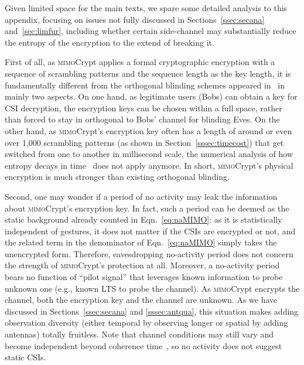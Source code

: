 \documentclass[conference,compsoc]{IEEEtran}
\newcommand{\name}{\textsc{mimo}Crypt\xspace}
\newcommand{\newrev}[1]{{\color{blue}#1}}    %
\newcommand{\newrev}[1]{#1}
\begin{document}
\newrev{
Given limited space for the main texts, we spare some detailed analysis to this appendix, focusing on issues not fully discussed in Sections~\ref{ssec:secana} and~\ref{sec:limfur}, including whether certain side-channel may substantially reduce the entropy of the encryption to the extend of breaking it. 

First of all, as \name applies a formal cryptographic encryption with a sequence of scrambling patterns and the sequence length as the key length, it is fundamentally different from the orthogonal blinding schemes appeared in~\cite{Strobe, Robin} in mainly two aspects. On one hand, as legitimate users (Bobs) can obtain a key for CSI decryption, the encryption keys can be chosen within a full space, rather than forced to stay in orthogonal to Bobs' channel for blinding Eves. On the other hand, as \name's encryption key often has a length of around or even over 1,000 scrambling patterns (as shown in Section~\ref{sssec:timecost}) that get switched from one to another in millisecond scale, the numerical analysis of how entropy decays in time~\cite{Robin} does not apply anymore. In short, \name's physical encryption is much stronger than existing orthogonal blinding.

Second, one may wonder if a period of no activity may leak the information about \name's encryption key. In fact, such a period can be deemed as the static background already counted in Eqn.~\eqref{eq:naMIMO}: as it is statistically independent of gestures, it does not matter if the CSIs are encrypted or not, and the related term in the denominator of Eqn.~\eqref{eq:naMIMO} simply takes the unencrypted form. Therefore, eavesdropping no-activity period does not concern the strength of \name's protection at all.
Moreover, a no-activity period bears no function of ``pilot signal'' that leverages known
information to probe unknown one (e.g., known LTS to probe the channel). As \name encrypts the
channel, both the encryption key and the channel are unknown. As we have discussed in Sections~\ref{ssec:secana} and \ref{sssec:antqua},
this situation makes adding observation diversity (either temporal by observing longer or
spatial by adding antennas) totally fruitless. Note that channel conditions may still vary and become independent beyond coherence time~\cite{tse2005fundamentals}, so no activity does not suggest static CSIs.

}
\end{document}
